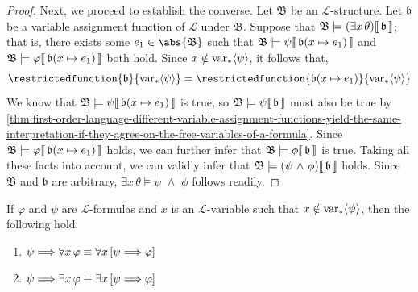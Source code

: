 \begin{proof}
    \vspace{0.3cm}
    \noindent
    Next, we proceed to establish the converse.
    Let \( \mathfrak{B} \) be an \( \mathcal{L} \)-structure.
    Let \( \mathfrak{b} \) be a variable assignment function of \( \mathcal{L} \) under \( \mathfrak{B} \).
    Suppose that \( \folwffsatisfaction{\mathfrak{B}}{\mleft( \exists x \, \theta \mright)}{\mathfrak{b}} \);
    that is, there exists some \( e_{1} \in \abs{\mathfrak{B}} \) such that
    \( \folwffsatisfaction{\mathfrak{B}}{\psi}{ \folmodifiedvariableassignmentfunction{\mathfrak{b}}{x}{e_{1}} } \)
    and \( \folwffsatisfaction{\mathfrak{B}}{\varphi}{ \folmodifiedvariableassignmentfunction{\mathfrak{b}}{x}{e_{1}} } \) both hold.
    Since \( x \notin \operatorname{var}_{\ast} \langle\psi\rangle \), it follows that,
    \begin{equation*}
        \restrictedfunction{\mathfrak{b}}{\folfreevars{\psi}} =
        \restrictedfunction{ \folmodifiedvariableassignmentfunction{\mathfrak{b}}{x}{e_{1}} }{\folfreevars{\psi}}
    \end{equation*}
    We know that \( \folwffsatisfaction{\mathfrak{B}}{\psi}{ \folmodifiedvariableassignmentfunction{\mathfrak{b}}{x}{e_{1}} } \) is true,
    so \(  \mathfrak{B} \models \psi\llbracket\, \mathfrak{b} \,\rrbracket \) must also be true by
    \cref{thm:first-order-language-different-variable-assignment-functions-yield-the-same-interpretation-if-they-agree-on-the-free-variables-of-a-formula}.
    Since \( \folwffsatisfaction{\mathfrak{B}}{\varphi}{ \folmodifiedvariableassignmentfunction{\mathfrak{b}}{x}{e_{1}} } \) holds, we can further infer
    that \(  \mathfrak{B} \models \phi\llbracket\, \mathfrak{b} \,\rrbracket \) is true.
    Taking all these facts into account, we can validly infer that \( \folwffsatisfaction{\mathfrak{B}}{ \mleft( \psi \,\,{\land}\,\, \phi \mright) }{\mathfrak{b}}\)
    holds. Since \( \mathfrak{B} \) and \( \mathfrak{b} \) are arbitrary, \( \exists x \, \theta \models \psi \,\,{\land}\,\, \phi \) follows readily.
\end{proof}

\begin{thm}
     \label{logical-equivalence:grouping-antecedent-into-quantified-consequent}
    If \( \varphi \) and \( \psi \) are \( \mathcal{L} \)-formulas and \( x \) is an \( \mathcal{L} \)-variable such that \( x \notin \operatorname{var}_{\ast} \langle\psi\rangle \),
    then the following hold:
    \begin{enumerate}[topsep=2pt,label=\textup{\texttt{(\alph*)}}]
        \item \( \psi {\implies} \forall x \, \varphi \equiv \forall x \, \mleft[ \psi {\implies} \varphi \mright] \)  \label{enum:universal-consequent}
        \item \( \psi {\implies} \exists x \, \varphi \equiv \exists x \, \mleft[ \psi {\implies} \varphi \mright] \)  \label{enum:existential-consequent}
    \end{enumerate}
\end{thm}

